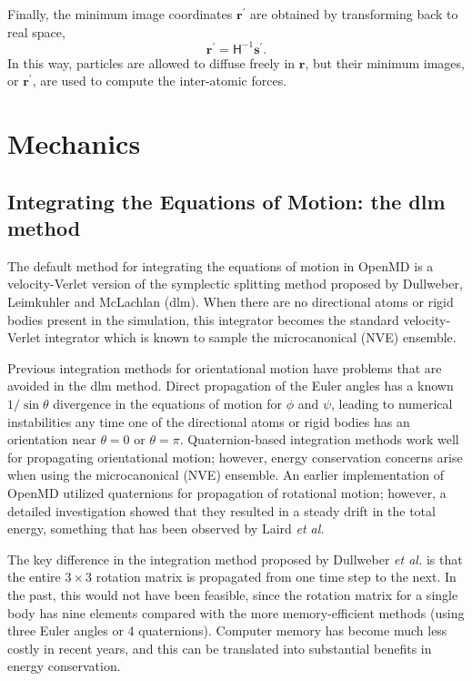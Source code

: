 \documentclass[]{book}
\begin{document}
Finally, the minimum image coordinates $\mathbf{r}^{\prime}$ are
obtained by transforming back to real space,
\begin{equation}
\mathbf{r}^{\prime}=\mathsf{H}^{-1}\mathbf{s}^{\prime}.%
\end{equation}
In this way, particles are allowed to diffuse freely in $\mathbf{r}$,
but their minimum images, or $\mathbf{r}^{\prime}$, are used to compute
the inter-atomic forces.

\chapter{\label{section:mechanics}Mechanics}

\section{\label{section:integrate}Integrating the Equations of Motion: the
{\sc dlm} method}

The default method for integrating the equations of motion in {\sc
OpenMD} is a velocity-Verlet version of the symplectic splitting method
proposed by Dullweber, Leimkuhler and McLachlan
({\sc dlm}).\cite{Dullweber1997} When there are no directional atoms or
rigid bodies present in the simulation, this integrator becomes the
standard velocity-Verlet integrator which is known to sample the
microcanonical (NVE) ensemble.\cite{Frenkel1996}

Previous integration methods for orientational motion have problems
that are avoided in the {\sc dlm} method.  Direct propagation of the Euler
angles has a known $1/\sin\theta$ divergence in the equations of
motion for $\phi$ and $\psi$,\cite{Allen87} leading to numerical
instabilities any time one of the directional atoms or rigid bodies
has an orientation near $\theta=0$ or $\theta=\pi$.  Quaternion-based
integration methods work well for propagating orientational motion;
however, energy conservation concerns arise when using the
microcanonical (NVE) ensemble.  An earlier implementation of {\sc
OpenMD} utilized quaternions for propagation of rotational motion;
however, a detailed investigation showed that they resulted in a
steady drift in the total energy, something that has been observed by
Laird {\it et al.}\cite{Laird97}

The key difference in the integration method proposed by Dullweber
\emph{et al.} is that the entire $3 \times 3$ rotation matrix is
propagated from one time step to the next. In the past, this would not
have been feasible, since the rotation matrix for a single body has
nine elements compared with the more memory-efficient methods (using
three Euler angles or 4 quaternions).  Computer memory has become much
less costly in recent years, and this can be translated into
substantial benefits in energy conservation.
\end{document}
